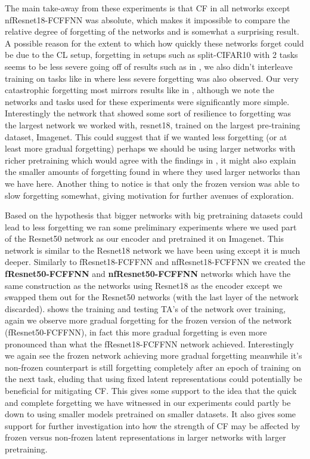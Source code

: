 The main take-away from these experiments is that CF in all networks except nfResnet18-FCFFNN was absolute, which makes it impossible to compare the relative degree of forgetting of the networks and is somewhat a surprising result. A possible reason for the extent to which how quickly these networks forget could be due to the CL setup, forgetting in setups such as split-CIFAR10 with 2 tasks seems to be less severe going off of results such as in \cite{ramasesh2020anatomy}, we also didn't interleave training on tasks like in \cite{toneva2018empirical} where less severe forgetting was also observed. Our very catastrophic forgetting most mirrors results like in \cite{mccloskey1989catastrophic}, although we note the networks and tasks used for these experiments were significantly more simple. Interestingly the network that showed some sort of resilience to forgetting was the largest network we worked with, resnet18, trained on the largest pre-training dataset, Imagenet. This could suggest that if we wanted less forgetting (or at least more gradual forgetting) perhaps we should be using larger networks with richer pretraining which would agree with the findings in \cite{ramasesh2022effect}, it might also explain the smaller amounts of forgetting found in \cite{ramasesh2020anatomy} where they used larger networks than we have here. Another thing to notice is that only the frozen version was able to slow forgetting somewhat, giving motivation for further avenues of exploration.

Based on the hypothesis that bigger networks with big pretraining datasets could lead to less forgetting we ran some preliminary experiments where we used part of the Resnet50 network as our encoder and pretrained it on Imagenet. This network is similar to the Resnet18 network we have been using except it is much deeper. Similarly to fResnet18-FCFFNN and nfResnet18-FCFFNN we created the \textbf{fResnet50-FCFFNN} and \textbf{nfResnet50-FCFFNN} networks which have the same construction as the networks using Resnet18 as the encoder except we swapped them out for the Resnet50 networks (with the last layer of the network discarded).  shows the training and testing TA's of the network over training, again we observe more gradual forgetting for the frozen version of the network (fResnet50-FCFFNN), in fact this more gradual forgetting is even more pronounced than what the fResnet18-FCFFNN network achieved. Interestingly we again see the frozen network achieving more gradual forgetting meanwhile it's non-frozen counterpart is still forgetting completely after an epoch of training on the next task, eluding that using fixed latent representations could potentially be beneficial for mitigating CF. This gives some support to the idea that the quick and complete forgetting we have witnessed in our experiments could partly be down to using smaller models pretrained on smaller datasets. It also gives some support for further investigation into how the strength of CF may be affected by frozen versus non-frozen latent representations in larger networks with larger pretraining. 

